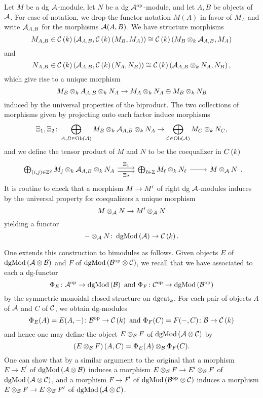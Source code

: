 Let \(M\) be a dg \(\mathcal{A}\)-module, let \(N\) be a dg \(\mathcal{A}^{{\operatorname{op}}}\)-module, and let \(A, B\) be objects of \(\mathcal{A}\).
For ease of notation, we drop the functor notation \(M(A)\) in favor of \(M_A\) and write \(\mathcal{A}_{A,B}\) for the morphisms \(\mathcal{A}(A, B)\).
We have structure morphisms
\[M_{A,B} \in \mathcal{C}\left(k\right)\left(\mathcal{A}_{A,B}, \mathcal{C}\left(k\right)(M_B, M_A)\right) \cong \mathcal{C}\left(k\right)\left(M_B \otimes_k \mathcal{A}_{A,B}, M_A\right)\]
and
\[N_{A,B} \in \mathcal{C}\left(k\right)\left(\mathcal{A}_{A,B}, \mathcal{C}\left(k\right)(N_A, N_B)\right) \cong \mathcal{C}\left(k\right)\left(\mathcal{A}_{A,B} \otimes_k N_A, N_B\right),\]
which give rise to a unique morphism
\[M_B \otimes_k {A}_{A,B} \otimes_k N_A \rightarrow M_A \otimes_k N_A \oplus M_B \otimes_k N_B\]
induced by the universal properties of the biproduct.
The two collections of morphisms given by projecting onto each factor induce morphisms 
\[\Xi_1, \Xi_2 \colon \bigoplus_{A,B \in \operatorname{Ob}(\mathcal{A})} M_B \otimes_k \mathcal{A}_{A,B} \otimes_k N_A \rightarrow \bigoplus_{\mathcal{C} \in \operatorname{Ob}(\mathcal{A})} M_C \otimes_k N_C,\]
and we define the tensor product of \(M\) and \(N\) to be the coequalizer in \(C\left(k\right)\)
\[\begin{tikzcd}
\bigoplus_{(i,j) \in \Z^2} M_j \otimes_k \A_{A,B} \otimes_k N_A \arrow[shift left]{r}{\Xi_1} \arrow[shift right,swap]{r}{\Xi_2} & \bigoplus_{\ell \in \Z} M_\ell \otimes_k N_\ell\arrow{r} & M \otimes_\A N
\end{tikzcd}.\]It is routine to check that a morphism \(M \rightarrow M^\prime\) of right dg \(\mathcal{A}\)-modules induces by the universal property for coequalizers a unique morphism
\[M \otimes_{\mathcal{A}} N \rightarrow M^\prime \otimes_{\mathcal{A}} N\]
yielding a functor
\[- \otimes_{\mathcal{A}} N \colon \operatorname{dgMod}\left(\mathcal{A}\right) \rightarrow \mathcal{C}\left(k\right).\]

One extends this construction to bimodules as follows.
Given objects \(E\) of \(\operatorname{dgMod}\left(\mathcal{A} \otimes \mathcal{B}\right)\) and \(F\) of \(\operatorname{dgMod}\left(\mathcal{B}^{{\operatorname{op}}} \otimes \mathcal{C}\right)\), we recall that we have associated to each a dg-functor
\[\Phi_E \colon \A^{\opp} \ra \dgMod{\B}\ \text{and}\ \Phi_F \colon \C^{\opp} \ra \dgMod{\B^{\opp}}\]
by the symmetric monoidal closed structure on \(\operatorname{dgcat}_k\).
For each pair of objects \(A\) of \(\mathcal{A}\) and \(C\) of \(\mathcal{C}\), we obtain dg-modules
\[\Phi_E(A) = E(A, -) \colon \B^{\opp} \ra \CH{k}\ \text{and}\ \Phi_F(C) = F( -, C) \colon \B \ra \CH{k}\]
and hence one may define the object \(E \otimes_{\mathcal{B}} F\) of \(\operatorname{dgMod}\left(\mathcal{A} \otimes \mathcal{C}\right)\) by
\[\left(E \otimes_{\mathcal{B}} F\right)(A, C) = \Phi_E(A) \otimes_{\mathcal{B}} \Phi_F(C).\]
One can show that by a similar argument to the original that a morphism \(E \to E^\prime\) of \(\operatorname{dgMod}\left(\mathcal{A} \otimes \mathcal{B}\right)\) induces a morphism \(E \otimes_{\mathcal{B}} F \to E^\prime \otimes_{\mathcal{B}} F\) of \(\operatorname{dgMod}\left(\mathcal{A} \otimes \mathcal{C}\right)\), and a morphism \(F \to F^\prime\) of \(\operatorname{dgMod}\left(\mathcal{B}^{{\operatorname{op}}} \otimes \mathcal{C}\right)\) induces a morphism \(E \otimes_{\mathcal{B}} F \to E \otimes_{\mathcal{B}} F^\prime\) of \(\operatorname{dgMod}\left(\mathcal{A} \otimes \mathcal{C}\right)\).

